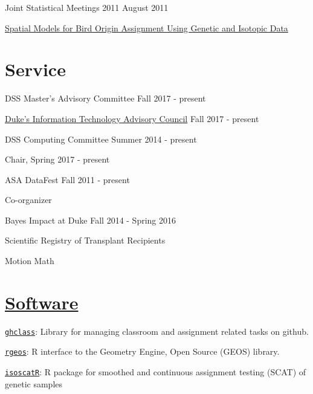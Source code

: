 \documentclass[margin,line]{res}
\begin{document}
\begin{resume}
Joint Statistical Meetings 2011 \hfill August 2011
\begin{list1}
\item[] \href{https://github.com/rundel/Presentations/tree/master/JSM%202011}{Spatial Models for Bird Origin Assignment Using Genetic and Isotopic Data}
\end{list1}
\vspace{-2mm}

\vspace{4mm}

\section{\sc Service}

DSS Master's Advisory Committee \hfill Fall 2017 - present

\href{http://services.duke.edu/itac/}{Duke's Information Technology Advisory Council} \hfill Fall 2017 - present

DSS Computing Committee \hfill Summer 2014 - present
\begin{list1}
\item[] Chair, Spring 2017 - present
\end{list1}

ASA DataFest \hfill Fall 2011 - present
\begin{list1}
\item[] Co-organizer
\end{list1}


Bayes Impact at Duke \hfill Fall 2014 - Spring 2016
\begin{list1}
\item[] Scientific Registry of Transplant Recipients
\item[] Motion Math
\end{list1}


\vspace{4mm}

\section{\sc \href{https://github.com/rundel/}{Software}}

\href{https://github.com/rundel/ghclass}{\texttt{ghclass}}: Library for managing classroom and assignment related tasks on github.

\href{https://github.com/rundel/rgeos}{\texttt{rgeos}}: R interface to the Geometry Engine, Open Source (GEOS) library.

\vspace{-0.15cm}
\href{https://github.com/rundel/isoscatR}{\texttt{isoscatR}}: R package for smoothed and continuous assignment testing (SCAT) of genetic samples


\end{resume}
\end{document}

